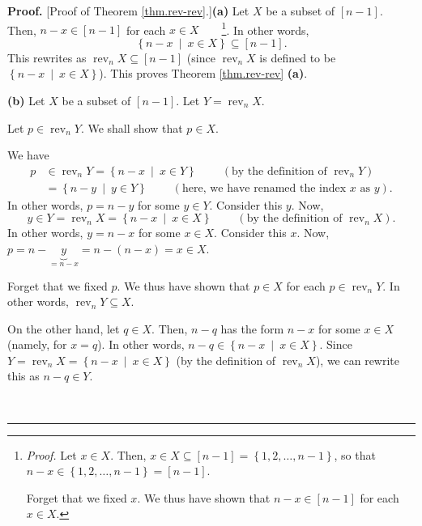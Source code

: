 \documentclass[numbers=enddot,12pt,final,onecolumn,notitlepage]{scrartcl}%
\theoremstyle{definition}
\newenvironment{proof}[1][Proof]{\noindent\textbf{#1.} }{\ \rule{0.5em}{0.5em}}
\begin{document}
\begin{proof}
[Proof of Theorem \ref{thm.rev-rev}.]\textbf{(a)} Let $X$ be a subset of
$\left[  n-1\right]  $. Then, $n-x\in\left[  n-1\right]  $ for each $x\in
X$\ \ \ \ \footnote{\textit{Proof.} Let $x\in X$. Then, $x\in X\subseteq
\left[  n-1\right]  =\left\{  1,2,\ldots,n-1\right\}  $, so that
$n-x\in\left\{  1,2,\ldots,n-1\right\}  =\left[  n-1\right]  $.
\par
Forget that we fixed $x$. We thus have shown that $n-x\in\left[  n-1\right]  $
for each $x\in X$.}. In other words,%
\[
\left\{  n-x\ \mid\ x\in X\right\}  \subseteq\left[  n-1\right]  .
\]
This rewrites as $\operatorname*{rev}\nolimits_{n}X\subseteq\left[
n-1\right]  $ (since $\operatorname*{rev}\nolimits_{n}X$ is defined to be
$\left\{  n-x\ \mid\ x\in X\right\}  $). This proves Theorem \ref{thm.rev-rev}
\textbf{(a)}. \medskip

\textbf{(b)} Let $X$ be a subset of $\left[  n-1\right]  $. Let
$Y=\operatorname*{rev}\nolimits_{n}X$.

Let $p\in\operatorname*{rev}\nolimits_{n}Y$. We shall show that $p\in X$.

We have%
\begin{align*}
p  &  \in\operatorname*{rev}\nolimits_{n}Y=\left\{  n-x\ \mid\ x\in Y\right\}
\ \ \ \ \ \ \ \ \ \ \left(  \text{by the definition of }\operatorname*{rev}%
\nolimits_{n}Y\right) \\
&  =\left\{  n-y\ \mid\ y\in Y\right\}  \ \ \ \ \ \ \ \ \ \ \left(
\text{here, we have renamed the index }x\text{ as }y\right)  .
\end{align*}
In other words, $p=n-y$ for some $y\in Y$. Consider this $y$. Now,%
\[
y\in Y=\operatorname*{rev}\nolimits_{n}X=\left\{  n-x\ \mid\ x\in X\right\}
\ \ \ \ \ \ \ \ \ \ \left(  \text{by the definition of }\operatorname*{rev}%
\nolimits_{n}X\right)  .
\]
In other words, $y=n-x$ for some $x\in X$. Consider this $x$. Now,
$p=n-\underbrace{y}_{=n-x}=n-\left(  n-x\right)  =x\in X$.

Forget that we fixed $p$. We thus have shown that $p\in X$ for each
$p\in\operatorname*{rev}\nolimits_{n}Y$. In other words, $\operatorname*{rev}%
\nolimits_{n}Y\subseteq X$.

On the other hand, let $q\in X$. Then, $n-q$ has the form $n-x$ for some $x\in
X$ (namely, for $x=q$). In other words, $n-q\in\left\{  n-x\ \mid\ x\in
X\right\}  $. Since $Y=\operatorname*{rev}\nolimits_{n}X=\left\{
n-x\ \mid\ x\in X\right\}  $ (by the definition of $\operatorname*{rev}%
\nolimits_{n}X$), we can rewrite this as $n-q\in Y$.


\end{proof}
\end{document}
